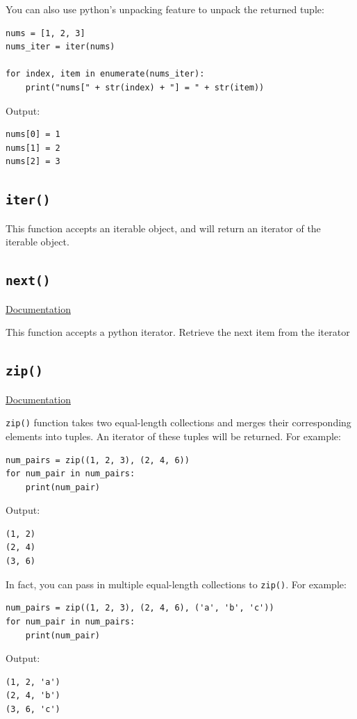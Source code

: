 \documentclass[12pt]{book}
\begin{document}
You can also use python's unpacking feature to unpack the returned tuple:
\begin{verbatim}
nums = [1, 2, 3]
nums_iter = iter(nums)

for index, item in enumerate(nums_iter):
    print("nums[" + str(index) + "] = " + str(item))
\end{verbatim}
Output:
\begin{verbatim}
nums[0] = 1
nums[1] = 2
nums[2] = 3
\end{verbatim}

\subsection{\texttt{iter()}}
\label{sec:org48babc4}
This function accepts an iterable object, and will return an iterator of the iterable object.
\subsection{\texttt{next()}}
\label{sec:org8b99e3f}
\href{https://docs.python.org/3/library/functions.html\#next}{Documentation}

This function accepts a python iterator. Retrieve the next item from the iterator
\subsection{\texttt{zip()}}
\label{sec:org4055ae7}
\href{https://docs.python.org/3/library/functions.html\#zip}{Documentation}

\texttt{zip()} function takes two equal-length collections and merges their corresponding elements into tuples. An iterator of these tuples will be returned. For example:
\begin{verbatim}
num_pairs = zip((1, 2, 3), (2, 4, 6))
for num_pair in num_pairs:
    print(num_pair)
\end{verbatim}
Output:
\begin{verbatim}
(1, 2)
(2, 4)
(3, 6)
\end{verbatim}
In fact, you can pass in multiple equal-length collections to \texttt{zip()}. For example:
\begin{verbatim}
num_pairs = zip((1, 2, 3), (2, 4, 6), ('a', 'b', 'c'))
for num_pair in num_pairs:
    print(num_pair)
\end{verbatim}
Output:
\begin{verbatim}
(1, 2, 'a')
(2, 4, 'b')
(3, 6, 'c')
\end{verbatim}
\end{document}
